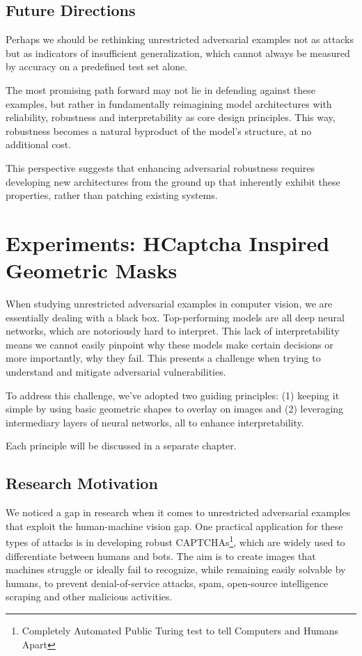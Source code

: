 \documentclass[a4paper, oneside]{discothesis}
\begin{document}
\section{Future Directions}

Perhaps we should be rethinking unrestricted adversarial examples not as attacks but as indicators of insufficient generalization, which cannot always be measured by accuracy on a predefined test set alone.

The most promising path forward may not lie in defending against these examples, but rather in fundamentally reimagining model architectures with reliability, robustness and interpretability as core design principles. This way, robustness becomes a natural byproduct of the model's structure, at no additional cost.

This perspective suggests that enhancing adversarial robustness requires developing new architectures from the ground up that inherently exhibit these properties, rather than patching existing systems.

% 
% 

\chapter{Experiments: HCaptcha Inspired Geometric Masks}

When studying unrestricted adversarial examples in computer vision, we are essentially dealing with a black box. Top-performing models are all deep neural networks, which are notoriously hard to interpret. This lack of interpretability means we cannot easily pinpoint why these models make certain decisions or more importantly, why they fail. This presents a challenge when trying to understand and mitigate adversarial vulnerabilities.

To address this challenge, we've adopted two guiding principles: (1) keeping it simple by using basic geometric shapes to overlay on images and (2) leveraging intermediary layers of neural networks, all to enhance interpretability.

Each principle will be discussed in a separate chapter.

\section{Research Motivation}

We noticed a gap in research when it comes to unrestricted adversarial examples that exploit the human-machine vision gap. One practical application for these types of attacks is in developing robust CAPTCHAs\footnote{Completely Automated Public Turing test to tell Computers and Humans Apart}, which are widely used to differentiate between humans and bots. The aim is to create images that machines struggle or ideally fail to recognize, while remaining easily solvable by humans, to prevent denial-of-service attacks, spam, open-source intelligence scraping and other malicious activities.
\end{document}
